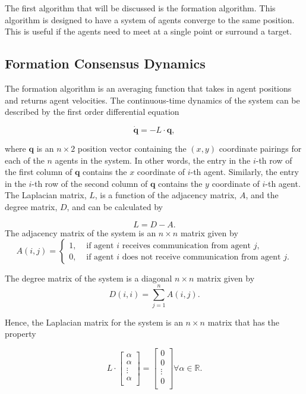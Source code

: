 \documentclass[../CourseManual.tex]{subfiles}
\begin{document}
The first algorithm that will be discussed is the formation algorithm. This algorithm is designed to have a system of agents converge to the same position. This is useful if the agents need to meet at a single point or surround a target.

\subsection{Formation Consensus Dynamics} \label{Formation Consensus Dynamics}
The formation algorithm is an averaging function that takes in agent positions and returns agent velocities. The continuous-time dynamics of the system can be described by the first order differential equation 

$$ \boldsymbol{\dot{q}} = - L \cdot \boldsymbol{q},$$

where $\boldsymbol{q}$ is an $n \times 2$  position vector containing the $(x, y)$ coordinate pairings for each of the $n$ agents in the system. In other words, the entry in the $i$-th row of the first column of $\boldsymbol{q}$ contains the $x$ coordinate of $i$-th agent. Similarly, the entry in the $i$-th row of the second column of $\boldsymbol{q}$ contains the $y$ coordinate of $i$-th agent. The Laplacian matrix, $L$, is a function of the adjacency matrix, $A$, and the degree matrix, $D$, and can be calculated by

\[ 
L = D -A.
\]
The adjacency matrix of the system is an $n \times n$ matrix given by
\[ 
A(i,j) = 
\begin{cases}
 1, & \text{ if agent $i$ receives communication from agent $j$,}\\
 0, & \text{ if agent $i$ does not receive communication from agent $j$.}
\end{cases}
\]

The degree matrix of the system is a diagonal $n \times n$ matrix given by
\[
D(i,i) = \sum_{j=1}^{n}{A(i,j)}.
\]

Hence, the Laplacian matrix for the system is an $n \times n$ matrix that has the property

\[
L \cdot
\begin{bmatrix}
\alpha \\
\alpha \\
\vdots \\
\alpha \\
\end{bmatrix}
=
\begin{bmatrix}
0 \\
0 \\
\vdots \\
0\\
\end{bmatrix}
\forall \alpha \in \mathbb{R}.
\]
\end{document}
